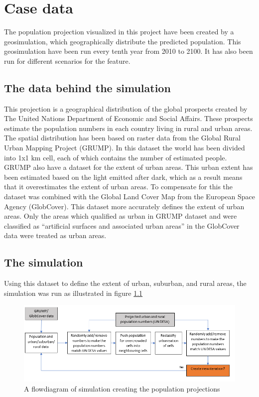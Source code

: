 \chapter{Case data}
The population projection visualized in this project have been created by a geosimulation, which geographically distribute the predicted population. This geosimulation have been run every tenth year from 2010 to 2100. It has also been run for different scenarios for the feature.

\section{The data behind the simulation}
This projection is a geographical distribution of the global prospects created by The United Nations Department of Economic and Social Affairs. These prospects estimate the population numbers in each country living in rural and urban areas. The spatial distribution has been based on raster data from the Global Rural Urban Mapping Project (GRUMP). In this dataset the world has been divided into 1x1 km cell, each of which contains the number of estimated people. 
GRUMP also have a dataset for the extent of urban areas. This urban extent has been estimated based on the light emitted after dark, which as a result means that it overestimates the extent of urban areas. To compensate for this the dataset was combined with the Global Land Cover Map from the European Space Agency (GlobCover). This dataset more accurately defines the extent of urban areas. Only the areas which qualified as urban in GRUMP dataset and were classified as “artificial surfaces and associated urban areas” in the GlobCover data were treated as urban areas. 

\section{The simulation}
Using this dataset to define the extent of urban, suburban, and rural areas, the simulation was run as illustrated in figure \ref{CreatingData}

\begin{figure} [H]
	\centering
	\includegraphics[width=.8\textwidth]{Pictures/CreatingData}
	\caption{A flowdiagram of simulation creating the population projections}
	\label{CreatingData}
\end{figure}

